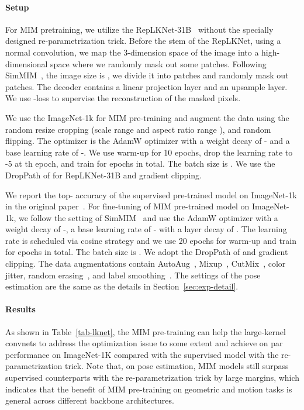 \documentclass{article}
\begin{document}
\paragraph{Setup}
For MIM pretraining, we utilize the RepLKNet-31B~\cite{replknet} without the specially designed re-parametrization trick. Before the stem of the RepLKNet, using a normal  convolution, we map the 3-dimension space of the image into a high-dimensional space where we randomly mask out some patches. Following SimMIM~\cite{xie2021simmim}, the image size is , we divide it into  patches and randomly mask out  patches. The decoder contains a linear projection layer and an upsample layer. We use -loss to supervise the reconstruction of the masked pixels.

We use the ImageNet-1k for MIM pre-training and augment the data using the random resize cropping (scale range  and aspect ratio range ), and random flipping. The optimizer is the AdamW\cite{Loshchilov2019adamw} optimizer with a weight decay of - and a base learning rate of -. We use warm-up for 10 epochs, drop the learning rate to -5 at th epoch, and train for  epochs in total. The batch size is . We use the DropPath of  for RepLKNet-31B and gradient clipping.

We report the top- accuracy of the supervised pre-trained model on ImageNet-1k in the original paper~\cite{replknet}. For fine-tuning of MIM pre-trained model on ImageNet-1k, we follow the setting of SimMIM~\cite{xie2021simmim} and use the AdamW optimizer with a weight decay of -, a base learning rate of - with a layer decay of . The learning rate is scheduled via cosine strategy and we use 20 epochs for warm-up and train for  epochs in total. The batch size is . We adopt the DropPath of  and gradient clipping. The data augmentations contain AutoAug~\cite{cubuk2018autoaugment}, Mixup~\cite{zhang2017mixup}, CutMix~\cite{yun2019cutmix}, color jitter, random erasing~\cite{zhong2020random}, and label smoothing~\cite{szegedy2016rethinking}.
The settings of the pose estimation are the same as the details in Section~\ref{sec:exp-detail}.

\paragraph{Results} As shown in Table~\ref{tab-lknet}, the MIM pre-training can help the large-kernel convnets to address the optimization issue to some extent and achieve on par performance on ImageNet-1K compared with the supervised model with the re-parametrization trick. Note that, on pose estimation, MIM models still surpass supervised counterparts with the re-parametrization trick by large margins, which indicates that the benefit of MIM pre-training on geometric and motion tasks is general across different backbone architectures.
\end{document}
